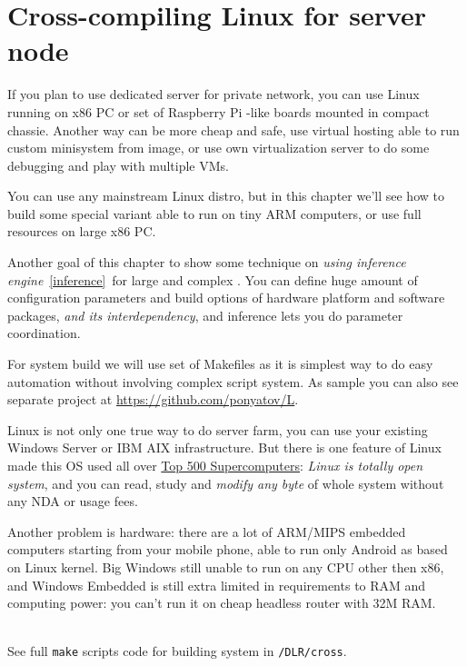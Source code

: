 \chapter{Cross-compiling Linux for server node}\label{cross}\clearpage

\noindent
If you plan to use dedicated server for private
network, you can use Linux running on x86 PC or set of Raspberry Pi -like boards
mounted in compact chassie. Another way can be more cheap and safe, use virtual
hosting able to run custom minisystem from image, or use own virtualization
server to do some debugging and play with multiple VMs.

You can use any mainstream Linux distro, but
in this chapter we'll see how to build some special 
variant able to run on tiny ARM computers, or use full resources on large x86
PC.

Another goal of this chapter to show some technique on \emph{using inference
engine}\ \ref{inference}\ for large and complex . You can define huge amount of configuration parameters and build
options of hardware platform and software packages, \emph{and its
interdependency}, and inference lets you do parameter coordination.

For system build we will use set of Makefiles as it is simplest way to do easy
automation without involving complex script system. As sample you can also see
separate project at \url{https://github.com/ponyatov/L}.

Linux is not only one true way to do server farm, you can use your existing
Windows Server or IBM AIX infrastructure. But there is one feature of Linux made
this OS used all over
\href{https://www.top500.org/statistics/details/osfam/1}{Top 500
Supercomputers}: \emph{Linux is totally open system}, and you can read, study
and \emph{modify any byte} of whole system without any NDA or usage fees.

Another problem is hardware: there are a lot of ARM/MIPS embedded computers
starting from your mobile phone, able to run only Android as based on Linux
kernel. Big Windows still unable to run on any CPU other then x86, and Windows Embedded is still extra limited in requirements to RAM
and computing power: you can't run it on cheap headless router with 32M RAM.

\clearpage
{}%
\\See full \verb|make| scripts code for building  system in
\verb|/DLR/cross|.

